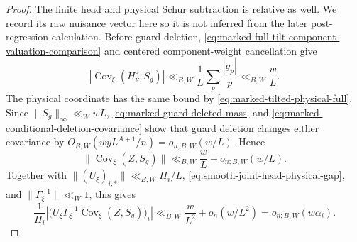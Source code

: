 \documentclass[11pt]{article}
\numberwithin{equation}{section}
\theoremstyle{definition}
\theoremstyle{remark}
\newcommand{\1}{\mathbf 1}
\begin{document}
\begin{proof}
The finite head and physical Schur subtraction is relative as well.  We
record its raw nuisance vector here so it is not inferred from the later
post-regression calculation.  Before guard deletion,
\eqref{eq:marked-full-tilt-component-valuation-comparison} and centered
component-weight cancellation give
\[
 |\operatorname{Cov}_\xi(H_\nu^\circ,S_g)|
 \ll_{B,W}\frac1L\sum_p\frac{|g_p|}{p}
 \ll_{B,W}\frac wL.
\]
The physical coordinate has the same bound by
\eqref{eq:marked-tilted-physical-full}.  Since
\(\|S_g\|_\infty\ll_WwL\),
\eqref{eq:marked-guard-deleted-mass} and
\eqref{eq:marked-conditional-deletion-covariance} show that guard
deletion changes either covariance by
\(O_{B,W}(wyL^{A+1}/n)=o_{n;B,W}(w/L)\).  Hence
\begin{equation}
 \|\operatorname{Cov}_\xi(Z,S_g)\|
 \ll_{B,W}\frac wL+o_{n;B,W}(w/L).
 \label{eq:smooth-raw-g-nuisance-vector}
\end{equation}
Together with
\(\|(U_\xi)_{i,*}\|\ll_{B,W}H_i/L\),
\eqref{eq:smooth-joint-head-physical-gap}, and
\(\|\Gamma_\xi^{-1}\|\ll_W1\), this gives
\begin{equation}
 \frac1{H_i}\left|
  \bigl(U_\xi\Gamma_\xi^{-1}
       \operatorname{Cov}_\xi(Z,S_g)\bigr)_i\right|
 \ll_{B,W}\frac w{L^2}+o_n(w/L^2)
 =o_{n;B,W}(w\alpha_i).
 \label{eq:smooth-raw-g-nuisance-Schur-row}
\end{equation}


\end{proof}
\end{document}
